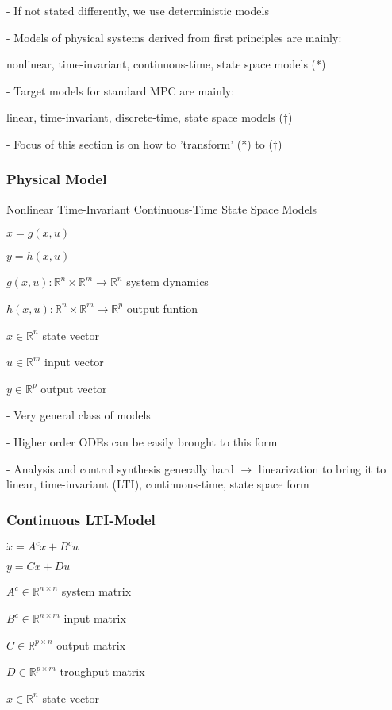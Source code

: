 - If not stated differently, we use deterministic models

- Models of physical systems derived from first principles are mainly:

nonlinear, time-invariant, continuous-time, state space models (*)

- Target models for standard MPC are mainly:

linear, time-invariant, discrete-time, state space models (†)

- Focus of this section is on how to ’transform’ (*) to (†)

\subsubsection{Physical Model}

Nonlinear Time-Invariant Continuous-Time State Space Models

$\dot{x} = g(x,u)$

$y = h(x,u)$

$g(x,u): \mathbb{R}^n \times \mathbb{R}^m \to \mathbb{R}^n$
system dynamics

$h(x,u): \mathbb{R}^n \times \mathbb{R}^m \to \mathbb{R}^p$
output funtion

$x \in \mathbb{R}^n$
state vector

$u \in \mathbb{R}^m$
input vector

$y \in \mathbb{R}^p$
output vector

- Very general class of models

- Higher order ODEs can be easily brought to this form

- Analysis and control synthesis generally hard
$\rightarrow$
linearization to bring it to linear, time-invariant (LTI),
continuous-time, state space form

\subsubsection{Continuous LTI-Model}

$\dot{x} = A^cx+B^cu$

$y = Cx+Du$

$A^c \in \mathbb{R}^{n \times n}$
system matrix

$B^c \in \mathbb{R}^{n \times m}$
input matrix

$C \in \mathbb{R}^{p \times n}$
output matrix

$D \in \mathbb{R}^{p \times m}$
troughput matrix

$x \in \mathbb{R}^n$
state vector

